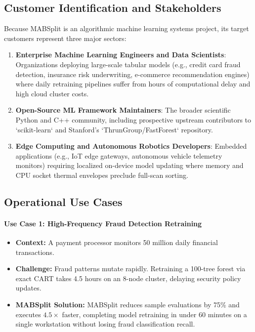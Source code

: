 \documentclass{article}
\begin{document}
	\subsection{Customer Identification and Stakeholders}
	Because MABSplit is an algorithmic machine learning systems project, its target customers represent three major sectors:
	\begin{enumerate}
		\item \textbf{Enterprise Machine Learning Engineers and Data Scientists}: Organizations deploying large-scale tabular models (e.g., credit card fraud detection, insurance risk underwriting, e-commerce recommendation engines) where daily retraining pipelines suffer from hours of computational delay and high cloud cluster costs.
		\item \textbf{Open-Source ML Framework Maintainers}: The broader scientific Python and C++ community, including prospective upstream contributors to `scikit-learn` and Stanford's `ThrunGroup/FastForest` repository.
		\item \textbf{Edge Computing and Autonomous Robotics Developers}: Embedded applications (e.g., IoT edge gateways, autonomous vehicle telemetry monitors) requiring localized on-device model updating where memory and CPU socket thermal envelopes preclude full-scan sorting.
	\end{enumerate}

	\subsection{Operational Use Cases}
	\paragraph{Use Case 1: High-Frequency Fraud Detection Retraining}
	\begin{itemize}
		\item \textbf{Context:} A payment processor monitors 50 million daily financial transactions.
		\item \textbf{Challenge:} Fraud patterns mutate rapidly. Retraining a 100-tree forest via exact CART takes 4.5 hours on an 8-node cluster, delaying security policy updates.
		\item \textbf{MABSplit Solution:} MABSplit reduces sample evaluations by 75\% and executes $4.5\times$ faster, completing model retraining in under 60 minutes on a single workstation without losing fraud classification recall.
	\end{itemize}
\end{document}
